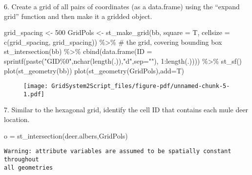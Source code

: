 \documentclass[
  letterpaper,
]{book}
\newenvironment{Shaded}{\begin{snugshade}}{\end{snugshade}}
\newcommand{\AttributeTok}[1]{\textcolor[rgb]{0.40,0.45,0.13}{#1}}
\newcommand{\CommentTok}[1]{\textcolor[rgb]{0.37,0.37,0.37}{#1}}
\newcommand{\DecValTok}[1]{\textcolor[rgb]{0.68,0.00,0.00}{#1}}
\newcommand{\FunctionTok}[1]{\textcolor[rgb]{0.28,0.35,0.67}{#1}}
\newcommand{\NormalTok}[1]{\textcolor[rgb]{0.00,0.23,0.31}{#1}}
\newcommand{\OtherTok}[1]{\textcolor[rgb]{0.00,0.23,0.31}{#1}}
\newcommand{\SpecialCharTok}[1]{\textcolor[rgb]{0.37,0.37,0.37}{#1}}
\newcommand{\StringTok}[1]{\textcolor[rgb]{0.13,0.47,0.30}{#1}}
\begin{document}
6. Create a grid of all pairs of coordinates (as a data.frame) using the
``expand grid'' function and then make it a gridded object.

\begin{Shaded}
\begin{Highlighting}[]
\NormalTok{grid\_spacing }\OtherTok{\textless{}{-}} \DecValTok{500}
\NormalTok{GridPols }\OtherTok{\textless{}{-}} \FunctionTok{st\_make\_grid}\NormalTok{(bb, }\AttributeTok{square =}\NormalTok{ T, }\AttributeTok{cellsize =} \FunctionTok{c}\NormalTok{(grid\_spacing, grid\_spacing)) }\SpecialCharTok{\%\textgreater{}\%} \CommentTok{\# the grid, covering bounding box}
  \FunctionTok{st\_intersection}\NormalTok{(bb) }\SpecialCharTok{\%\textgreater{}\%}
    \FunctionTok{cbind}\NormalTok{(}\FunctionTok{data.frame}\NormalTok{(}\AttributeTok{ID =} \FunctionTok{sprintf}\NormalTok{(}\FunctionTok{paste}\NormalTok{(}\StringTok{"GID\%0"}\NormalTok{,}\FunctionTok{nchar}\NormalTok{(}\FunctionTok{length}\NormalTok{(.)),}\StringTok{"d"}\NormalTok{,}\AttributeTok{sep=}\StringTok{""}\NormalTok{), }\DecValTok{1}\SpecialCharTok{:}\FunctionTok{length}\NormalTok{(.)))) }\SpecialCharTok{\%\textgreater{}\%}
    \FunctionTok{st\_sf}\NormalTok{()}
\FunctionTok{plot}\NormalTok{(}\FunctionTok{st\_geometry}\NormalTok{(bb))}
\FunctionTok{plot}\NormalTok{(}\FunctionTok{st\_geometry}\NormalTok{(GridPols),}\AttributeTok{add=}\NormalTok{T)}
\end{Highlighting}
\end{Shaded}

\begin{figure}[H]

{\centering \texttt{[image: GridSystem2Script\_files/figure-pdf/unnamed-chunk-5-1.pdf]}

}

\end{figure}

7. Similar to the hexagonal grid, identify the cell ID that contains
each mule deer location.

\begin{Shaded}
\begin{Highlighting}[]
\NormalTok{o }\OtherTok{=} \FunctionTok{st\_intersection}\NormalTok{(deer.albers,GridPols)}
\end{Highlighting}
\end{Shaded}

\begin{verbatim}
Warning: attribute variables are assumed to be spatially constant throughout
all geometries
\end{verbatim}
\end{document}
